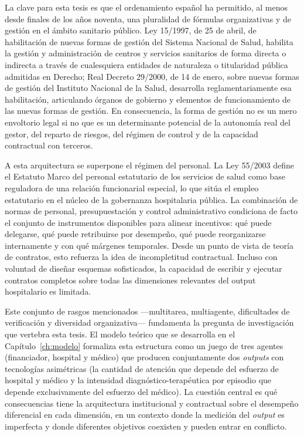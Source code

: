 La clave para esta tesis es que el ordenamiento español ha permitido, al menos desde finales de los años noventa, una pluralidad de fórmulas organizativas y de gestión en el ámbito sanitario público. Ley 15/1997, de 25 de abril, de habilitación de nuevas formas de gestión del Sistema Nacional de Salud, habilita la gestión y administración de centros y servicios sanitarios de forma directa o indirecta a través de cualesquiera entidades de naturaleza o titularidad pública admitidas en Derecho; Real Decreto 29/2000, de 14 de enero, sobre nuevas formas de gestión del Instituto Nacional de la Salud, desarrolla reglamentariamente esa habilitación, articulando órganos de gobierno y elementos de funcionamiento de las nuevas formas de gestión. En consecuencia, la forma de gestión no es un mero envoltorio legal si no que es un determinante potencial de la autonomía real del gestor, del reparto de riesgos, del régimen de control y de la capacidad contractual con terceros.

A esta arquitectura se superpone el régimen del personal. La Ley 55/2003 define el Estatuto Marco del personal estatutario de los servicios de salud como base reguladora de una relación funcionarial especial, lo que sitúa el empleo estatutario en el núcleo de la gobernanza hospitalaria pública. La combinación de normas de personal, presupuestación y control administrativo condiciona de facto el conjunto de instrumentos disponibles para alinear incentivos: qué puede delegarse, qué puede retribuirse por desempeño, qué puede reorganizarse internamente y con qué márgenes temporales. Desde un punto de vista de teoría de contratos, esto refuerza la idea de incompletitud contractual. Incluso con voluntad de diseñar esquemas sofisticados, la capacidad de escribir y ejecutar contratos completos sobre todas las dimensiones relevantes del output hospitalario es limitada.

Este conjunto de rasgos mencionados ---multitarea, multiagente, dificultades de verificación y diversidad organizativa--- fundamenta la pregunta de investigación que vertebra esta tesis. El modelo teórico que se desarrolla en el Capítulo~\ref{ch:modelo} formaliza esta estructura como un juego de tres agentes  (financiador, hospital y médico) que producen conjuntamente dos \textit{outputs} con tecnologías asimétricas (la cantidad de atención que depende del esfuerzo de hospital y médico y la intensidad diagnóstico-terapéutica por episodio que depende exclusivamente del esfuerzo del médico). La cuestión central es qué consecuencias tiene la arquitectura institucional y contractual sobre el desempeño diferencial en cada dimensión, en un contexto donde la medición del \textit{output} es imperfecta y donde diferentes objetivos coexisten y pueden entrar en conflicto.

